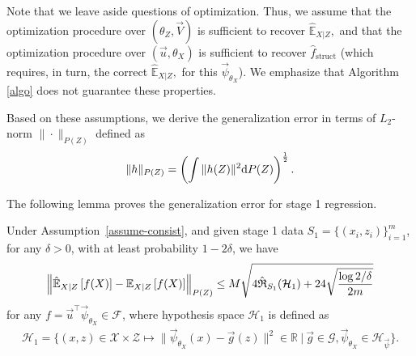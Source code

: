 Note that we leave aside questions of optimization. Thus, we assume that the optimization procedure over $(\theta_Z,\vec{V})$ is sufficient to recover $\hat{\mathbb{E}}_{X|Z},$ and that the optimization procedure over $(\vec{u},\theta_X)$ is sufficient to recover $\hat f_{\mathrm{struct}}$ (which requires, in turn, the correct $\hat{\mathbb{E}}_{X|Z},$ for this $\vec{\psi}_{\theta_X}$). We emphasize that Algorithm \ref{algo} does not guarantee these properties. 

Based on these assumptions, we derive the generalization error in terms of $L_2$-norm $\|\cdot\|_{P(Z)}$ defined as
\begin{align*}
    \|h\|_{P(Z)} = \left(\int \|h(Z)\|^2 \intd P(Z)\right)^{\frac12}.
\end{align*}

The following lemma proves the generalization error for stage 1 regression.
\begin{lem}\label{lem:1}
    Under Assumption~\ref{assume-consist}, and given stage 1 data $S_1 = \{(x_i, z_i)\}_{i=1}^m$, for any $\delta>0$, with at least probability $1-2\delta$, we have
    \begin{align*}
        \left\|\hatexpect[X|Z]{f(X)} - \expect[X|Z]{f(X)}\right\|_{P(Z)} \leq M\sqrt{4\hat{\mathfrak{R}}_{S_1}(\mathcal{H}_1) + 24\sqrt{\frac{\log 2/\delta}{2m}}}
    \end{align*}
    for any $f = \vec{u}^\top \vec{\psi}_{\theta_X} \in \mathcal{F}$, where hypothesis space $\mathcal{H}_1$ is defined as
    \begin{align}
        \mathcal{H}_1 = \{(x,z) \in \mathcal{X}\times \mathcal{Z} \mapsto \|\vec{\psi}_{\theta_X}(x) - \vec{g}(z) \|^2 \in \mathbb{R} ~|~ \vec{g} \in \mathcal{G},\vec{\psi}_{\theta_X} \in \mathcal{H}_{\vec{\psi}}\}. \label{eq:def-h1}
    \end{align}
\end{lem}


